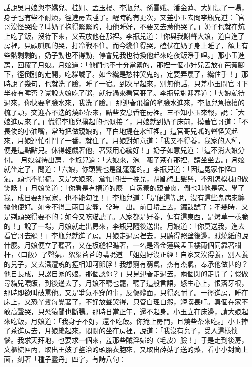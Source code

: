 \begin{showcontents}{}
話說吳月娘與李嬌兒、桂姐、孟玉樓、李瓶兒、孫雪娥、潘金蓮、大姐混了一場，身子也有些不耐煩，徑進房去睡了。醒時約有更次，又差小玉去問李瓶兒道：「官哥沒怪哭麼？叫奶子抱得緊緊的，拍他睡好，不要又去惹他哭了。」奶子也就在炕上吃了飯，沒待下來，又丟放他在那裡。李瓶兒道：「你與我謝聲大娘，道自進了房裡，只顧呱呱的哭，打冷戰不住。而今纔住得哭，磕伏在奶子身上睡了，額上有些熱剩剩的，奶子動也不得動，停會兒我也待換他起來吃夜飯淨手哩。」那小玉進房，回覆了月娘。月娘道：「他們也不十分當緊的，那裡一個小娃兒丟放在芭蕉腳下，徑倒別的走開，吃貓諕了。如今纔是愁神哭鬼的，定要弄壞了，纔住手！」那時說了幾句，也就洗了臉，睡了一宿。到次早起來，別無他話，只差小玉問官哥下半夜有睡否？還說大娘吃了粥，就待過來看官哥了。李瓶兒對迎春道：「大娘就待過來，你快要拿臉水來，我洗了臉。」那迎春飛搶的拿臉水進來，李瓶兒急攘攘的梳了頭，交迎春不迭的燒起茶來，點些安息香在房裡。三不知小玉來報，說：「大娘進房來了。」慌得李瓶兒撲起的也似接了，月娘就到奶子床前，摸著官哥道：「不長俊的小油嘴，常時把做親娘的，平白地提在水缸裡。」這官哥兒呱的聲怪哭起來，月娘連忙引鬥了一番，就住了。月娘對如意道：「我又不得養，我家的人種，便是這點點兒。休得輕覷著他，著緊用心纔好！」奶子如意兒道：「這不消大娘分付。」月娘就待出房，李瓶兒道：「大娘來，泡一甌子茶在那裡，請坐坐去。」月娘就坐定了，問道：「六娘，你頭鬢也是亂蓬蓬的。」李瓶兒道：「因這冤家作怪□氣，頭也不得梳。又是大娘來，倉忙的扭一挽兒，胡亂磕上髮髻，不知怎模樣的做笑話！」月娘笑道：「你看是有槽道的麼！自家養的親骨肉，倒也叫他是家。學了我，成日要那冤家，也不能勾哩！」李瓶兒道：「是便這等說，沒有這些鬼病來纏擾他便好。如今不得三兩日安靜，常時一出。前日墳上去，鑼鼓諕了；不幾時，又是剃頭哭得要不的；如今又吃貓諕了。人家都是好養，偏有這東西，是燈草一樣脆的！」說了一場，月娘就走出房來，李瓶兒隨後送出。月娘道：「你莫送我，進去看官哥去罷！」李瓶兒就進了房。月娘走過房裡去，只聽得照壁後邊，賊燒紙的說什麼。月娘便立了聽著，又在板縫裡瞧著，一名是潘金蓮與孟玉樓兩個同靠著欄杆，〈口敝〉了聲氣，絮絮荅荅的講說道：「姐姐好沒正經！自家又沒得養，別人養的兒子，又去漒遭魂的掗相知呵卵脬！我想窮有窮氣，杰有杰氣，奉承他做甚的？他自長成，只認自家的娘，那個認你？」只見迎春走過去，兩個閃的走開了；假做尋貓兒喂飯，到後邊去了。月娘不聽也罷，聽了這般言語，怒生心上，恨落牙根，那時即欲叫破罵他。又是爭氣不穿的事，反傷體面，只得忍耐了。一徑進房，睡在床上，又恐丫鬟每覺著了，不好放聲哭得，只管自理自怨，短嘆長吁。真個在家不敢高聲哭，只恐猿聞也斷腸。那時日當正午，還不起身。小玉立在床邊，請大娘起來吃飯，月娘道：「我身子不好，還不吃飯。你掩上房門，且燒些茶來吃。」小玉捧了茶進房去，月娘纔起來，悶悶的坐在房裡，說道：「我沒有兒子，受人這樣懊惱。我求天拜地，也要求一個來，羞那些賊淫婦的〈毛皮〉臉！」于是走到後房，文櫃梳匣內，取出王妓子整治的頭胎衣胞來，又取出薛姑子送的藥，看小小封筒上面，刻著「種子靈丹」四字，有詩八句：


\end{showcontents}
